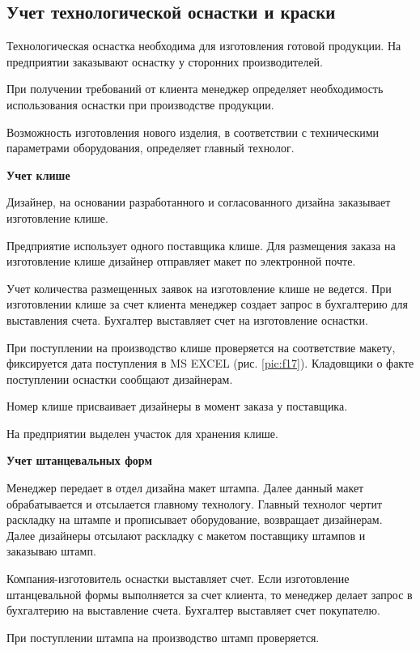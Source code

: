 \newpage
\subsection{Учет технологической оснастки и краски }
\label{bp:rigging}
%
Технологическая оснастка необходима для изготовления готовой продукции. На предприятии заказывают оснастку у сторонних производителей.

При получении требований от клиента менеджер определяет необходимость использования оснастки при производстве продукции. 

Возможность изготовления нового изделия, в соответствии с техническими параметрами оборудования, определяет главный технолог. 




\textbf{Учет клише}

Дизайнер, на основании разработанного и согласованного дизайна заказывает изготовление клише. 

Предприятие использует одного поставщика клише. 
Для размещения заказа на изготовление клише дизайнер отправляет макет по электронной почте.

Учет количества размещенных заявок на изготовление клише не ведется. 
При изготовлении клише за счет клиента менеджер создает запрос в бухгалтерию для выставления счета. Бухгалтер выставляет счет на изготовление оснастки.

При поступлении на производство клише проверяется на соответствие макету, фиксируется дата поступления в MS EXCEL (рис. \ref{pic:f17}). Кладовщики о факте поступлении оснастки сообщают дизайнерам. 

Номер клише присваивает дизайнеры в момент заказа у поставщика.

На предприятии выделен участок для хранения клише.


\textbf{Учет штанцевальных форм}

 Менеджер передает в отдел дизайна макет штампа. Далее данный макет обрабатывается и отсылается главному технологу. Главный технолог чертит раскладку на штампе и прописывает оборудование, возвращает дизайнерам. Далее дизайнеры отсылают раскладку с макетом поставщику штампов и заказываю штамп.

Компания-изготовитель оснастки выставляет счет. Если изготовление штанцевальной формы выполняется за счет клиента, то менеджер делает запрос в бухгалтерию на выставление счета. Бухгалтер выставляет счет покупателю.

При поступлении штампа на производство  штамп проверяется. 

